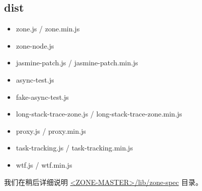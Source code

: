 \subsection{dist}


\begin{itemize}
  \item zone.js / zone.min.js
  \item zone-node.js
  \item jasmine-patch.js / jasmine-patch.min.js
\end{itemize}



\begin{itemize}
  \item async-test.js
  \item fake-async-test.js
  \item long-stack-trace-zone.js / long-stack-trace-zone.min.js
  \item proxy.js / proxy.min.js
  \item task-tracking.js / task-tracking.min.js
  \item wtf.js / wtf.min.js
\end{itemize}


我们在稍后详细说明
\href{https://github.com/angular/zone.js/tree/master/lib/zone-spec}
{<ZONE-MASTER>/lib/zone-spec}
目录。
